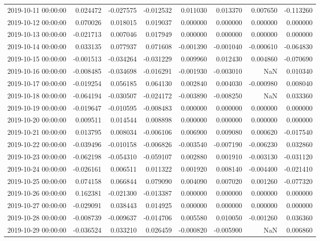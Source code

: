 \begin{tabular}{lrrrrrrr}
2019-10-11 00:00:00 & 0.024472 & -0.027575 & -0.012532 & 0.011030 & 0.013370 & 0.007650 & -0.113260 \\
2019-10-12 00:00:00 & 0.070026 & 0.018015 & 0.019037 & 0.000000 & 0.000000 & 0.000000 & 0.000000 \\
2019-10-13 00:00:00 & -0.021713 & 0.007046 & 0.017949 & 0.000000 & 0.000000 & 0.000000 & 0.000000 \\
2019-10-14 00:00:00 & 0.033135 & 0.077937 & 0.071608 & -0.001390 & -0.001040 & -0.000610 & -0.064830 \\
2019-10-15 00:00:00 & -0.001513 & -0.034264 & -0.031229 & 0.009960 & 0.012430 & 0.004860 & -0.070690 \\
2019-10-16 00:00:00 & -0.008485 & -0.034698 & -0.016291 & -0.001930 & -0.003010 & NaN & 0.010340 \\
2019-10-17 00:00:00 & -0.019254 & 0.056185 & 0.064130 & 0.002840 & 0.004030 & -0.000980 & 0.008040 \\
2019-10-18 00:00:00 & -0.064194 & -0.030507 & -0.024172 & -0.003890 & -0.008250 & NaN & 0.033360 \\
2019-10-19 00:00:00 & -0.019647 & -0.010595 & -0.008483 & 0.000000 & 0.000000 & 0.000000 & 0.000000 \\
2019-10-20 00:00:00 & 0.009511 & 0.014544 & 0.008898 & 0.000000 & 0.000000 & 0.000000 & 0.000000 \\
2019-10-21 00:00:00 & 0.013795 & 0.008034 & -0.006106 & 0.006900 & 0.009080 & 0.000620 & -0.017540 \\
2019-10-22 00:00:00 & -0.039496 & -0.010158 & -0.006826 & -0.003540 & -0.007190 & -0.006230 & 0.032860 \\
2019-10-23 00:00:00 & -0.062198 & -0.054310 & -0.059107 & 0.002880 & 0.001910 & -0.003130 & -0.031120 \\
2019-10-24 00:00:00 & -0.026161 & 0.006511 & 0.011322 & 0.001920 & 0.008140 & -0.004400 & -0.021410 \\
2019-10-25 00:00:00 & 0.074158 & 0.066844 & 0.079090 & 0.004090 & 0.007020 & 0.001260 & -0.077320 \\
2019-10-26 00:00:00 & 0.162381 & -0.021300 & -0.013387 & 0.000000 & 0.000000 & 0.000000 & 0.000000 \\
2019-10-27 00:00:00 & -0.029091 & 0.038443 & 0.014925 & 0.000000 & 0.000000 & 0.000000 & 0.000000 \\
2019-10-28 00:00:00 & -0.008739 & -0.009637 & -0.014706 & 0.005580 & 0.010050 & -0.001260 & 0.036360 \\
2019-10-29 00:00:00 & -0.036524 & 0.033210 & 0.026459 & -0.000820 & -0.005900 & NaN & 0.006860 \\

\end{tabular}
